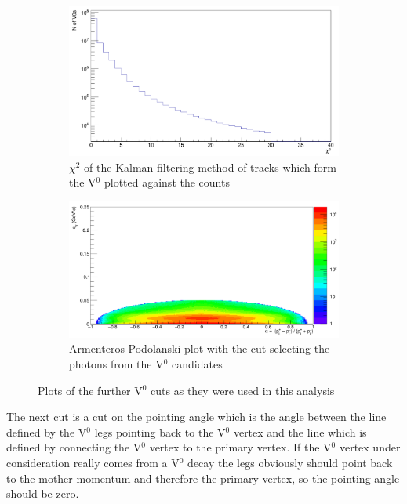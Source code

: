 \begin{figure}
\begin{subfigure}[h]{.4\linewidth}
\includegraphics[width=1.0\textwidth]{Figures/V0cuts/V0chi2.png}
\caption{$\chi^2$ of the Kalman filtering method of tracks which form the V$^0$ plotted against the counts}
\label{fig:V0chi2}
\end{subfigure}\hspace{1cm}%
\begin{subfigure}[h]{.4\linewidth}
\includegraphics[width=1.0\linewidth]{Figures/V0cuts/armpod.png}
\caption{Armenteros-Podolanski plot with the cut selecting the photons from the V$^0$ candidates}
\label{fig:V0armpod}
\end{subfigure}
\vspace{0.5cm}
\caption{Plots of the further V$^0$ cuts as they were used in this analysis}
\label{fig:V0cuts}
\end{figure} 
The next cut is a cut on the pointing angle which is the angle between the line defined by the V$^0$ legs pointing back to the V$^0$ vertex and the line which is defined by connecting the V$^0$ vertex to the primary vertex. If the V$^0$ vertex under consideration really comes from a V$^0$ decay the legs obviously should point back to the mother momentum and therefore the primary vertex, so the pointing angle should be zero. \\
